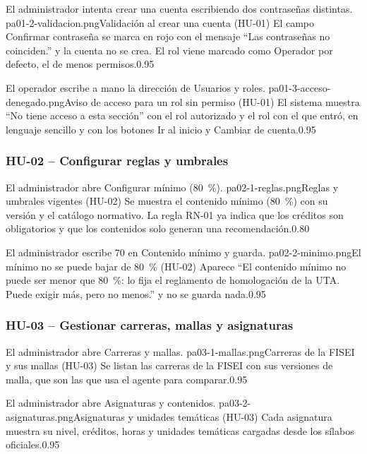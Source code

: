 {El administrador intenta crear una cuenta escribiendo dos contraseñas distintas.}
{pa01-2-validacion.png}{Validación al crear una cuenta (HU-01)}
{El campo Confirmar contraseña se marca en rojo con el mensaje ``Las contraseñas no coinciden.'' y la cuenta no se crea.
El rol viene marcado como Operador por defecto, el de menos permisos.}{0.95}

{El operador escribe a mano la dirección de Usuarios y roles.}
{pa01-3-acceso-denegado.png}{Aviso de acceso para un rol sin permiso (HU-01)}
{El sistema muestra ``No tiene acceso a esta sección'' con el rol autorizado y el rol con el que entró, en lenguaje
sencillo y con los botones Ir al inicio y Cambiar de cuenta.}{0.95}

\subsubsection{HU-02 -- Configurar reglas y umbrales}

{El administrador abre Configurar mínimo (80~\%).}
{pa02-1-reglas.png}{Reglas y umbrales vigentes (HU-02)}
{Se muestra el contenido mínimo (80~\%) con su versión y el catálogo normativo. La regla RN-01 ya indica que los
créditos son obligatorios y que los contenidos solo generan una recomendación.}{0.80}

{El administrador escribe 70 en Contenido mínimo y guarda.}
{pa02-2-minimo.png}{El mínimo no se puede bajar de 80~\% (HU-02)}
{Aparece ``El contenido mínimo no puede ser menor que 80~\%: lo fija el reglamento de homologación de la UTA. Puede
exigir más, pero no menos.'' y no se guarda nada.}{0.95}

\subsubsection{HU-03 -- Gestionar carreras, mallas y asignaturas}

{El administrador abre Carreras y mallas.}
{pa03-1-mallas.png}{Carreras de la FISEI y sus mallas (HU-03)}
{Se listan las carreras de la FISEI con sus versiones de malla, que son las que usa el agente para comparar.}{0.95}

{El administrador abre Asignaturas y contenidos.}
{pa03-2-asignaturas.png}{Asignaturas y unidades temáticas (HU-03)}
{Cada asignatura muestra su nivel, créditos, horas y unidades temáticas cargadas desde los sílabos oficiales.}{0.95}

